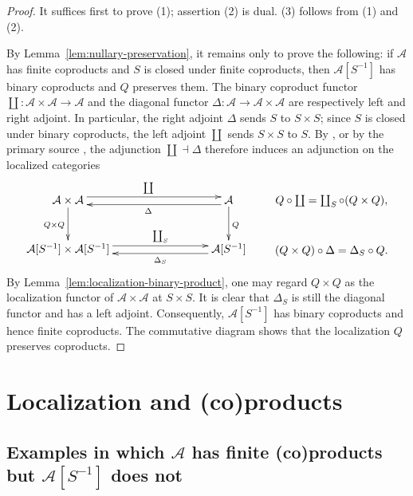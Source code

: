 \documentclass[10pt,a4paper]{amsart}
\theoremstyle{plain}
\theoremstyle{definition}
\theoremstyle{remark}
\begin{document}
\begin{proof}
  It suffices first to prove (1); assertion (2) is dual.
  (3) follows from (1) and (2).

  \medskip

  By Lemma~\ref{lem:nullary-preservation}, it remains only to prove the following: if $\mathcal{A}$ has finite coproducts and $S$ is closed under finite coproducts, then $\mathcal{A}[S^{-1}]$ has binary coproducts and $Q$ preserves them.
  The binary coproduct functor $\coprod : \mathcal{A} \times \mathcal{A} \longrightarrow \mathcal{A}$ and the diagonal functor $\Delta : \mathcal{A} \longrightarrow \mathcal{A} \times \mathcal{A}$ are respectively left and right adjoint.
  In particular, the right adjoint $\Delta$ sends $S$ to $S \times S$; since $S$ is closed under binary coproducts, the left adjoint $\coprod$ sends $S \times S$ to $S$.
  By \cite[Lemma~1.1.6, p.~9]{KrauseHomologicalTheory}, or by the primary source \cite[Chapter~I, \S~1, Lemma~1.2, p.~7]{GabrielZisman}, the adjunction $\coprod \dashv \Delta$ therefore induces an adjunction on the localized categories
  \[
    \xymatrix@C=30mm@R=10mm{
    \mathcal A\times\mathcal A
    \ar@<0.8ex>[r]^{\coprod}
    \ar[d]_{Q\times Q}
    &
    \mathcal A
    \ar@<0.8ex>[l]^{\Delta}
    \ar[d]^{Q}
    \\
    \mathcal A[S^{-1}]\times\mathcal A[S^{-1}]
    \ar@<0.8ex>[r]^-{\coprod_S}
    &
    \mathcal A[S^{-1}]
    \ar@<0.8ex>[l]^-{\Delta_S}
    } \qquad \xymatrix@R=10mm{
    Q \circ \coprod = \coprod _S \circ (Q \times Q),\\
    (Q \times Q) \circ \Delta = \Delta_S \circ Q.
    }
  \]
  By Lemma~\ref{lem:localization-binary-product}, one may regard $Q \times Q$ as the localization functor of $\mathcal{A} \times \mathcal{A}$ at $S \times S$.
  It is clear that $\Delta_S$ is still the diagonal functor and has a left adjoint.
  Consequently, $\mathcal{A}[S^{-1}]$ has binary coproducts and hence finite coproducts.
  The commutative diagram shows that the localization $Q$ preserves coproducts.
\end{proof}

\section{Localization and (co)products}\label{sec:finite-counterexamples}

\subsection{Examples in which \texorpdfstring{$\mathcal{A}$}{} has finite (co)products but \texorpdfstring{$\mathcal{A}[S^{-1}]$}{} does not}
\end{document}
